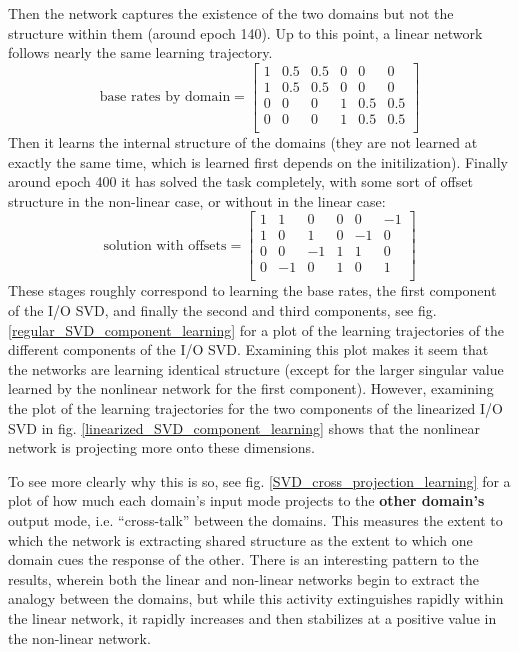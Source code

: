 \documentclass[10pt,letterpaper]{article}
\begin{document}
Then the network captures the existence of the two domains but not the structure within them (around epoch 140). Up to this point, a linear network follows nearly the same learning trajectory.
\[ 
\text{base rates by domain} = \left[ \begin{matrix} 
1 & 0.5 & 0.5 & 0 & 0 & 0 \\
1 & 0.5 & 0.5 & 0 & 0 & 0 \\
0 & 0 & 0 & 1 & 0.5 & 0.5  \\
0 & 0 & 0 & 1 & 0.5 & 0.5  \\
\end{matrix}  \right] 
\] 
Then it learns the internal structure of the domains (they are not learned at exactly the same time, which is learned first depends on the initilization). Finally around epoch 400 it has solved the task completely, with some sort of offset structure in the non-linear case, or without in the linear case:
\[
\text{solution with offsets} = \left[ \begin{matrix} 
1 & 1 & 0 & 0 & 0 & -1 \\
1 & 0 & 1 & 0 & -1 & 0 \\
 0 & 0 & -1 & 1 & 1 & 0\\
 0 & -1 & 0 & 1 & 0 & 1\\
\end{matrix}  \right] 
\]
These stages roughly correspond to learning the base rates, the first component of the I/O SVD, and finally the second and third components, see fig. \ref{regular_SVD_component_learning} for a plot of the learning trajectories of the different components of the I/O SVD. Examining this plot makes it seem that the networks are learning identical structure (except for the larger singular value learned by the nonlinear network for the first component). However, examining the plot of the learning trajectories for the two components of the linearized I/O SVD in fig. \ref{linearized_SVD_component_learning} shows that the nonlinear network is projecting more onto these dimensions. \par 
To see more clearly why this is so, see fig. \ref{SVD_cross_projection_learning} for a plot of how much each domain's input mode projects to the \textbf{other domain's} output mode, i.e. ``cross-talk'' between the domains. This measures the extent to which the network is extracting shared structure as the extent to which one domain cues the response of the other. There is an interesting pattern to the results, wherein both the linear and non-linear networks begin to extract the analogy between the domains, but while this activity extinguishes rapidly within the linear network, it rapidly increases and then stabilizes at a positive value in the non-linear network. \par
\end{document}
